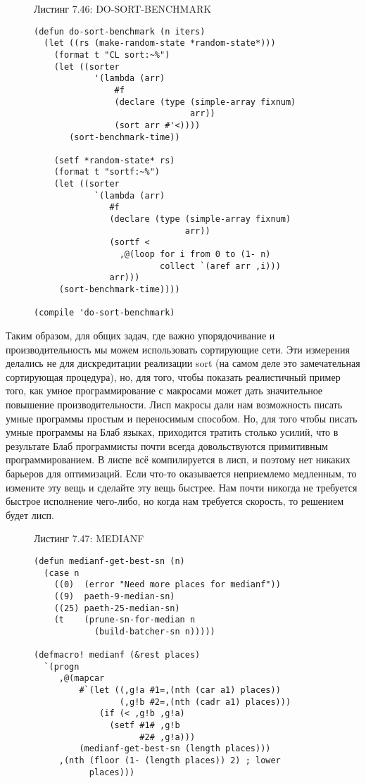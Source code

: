 \begin{figure}Листинг 7.46: DO-SORT-BENCHMARK\label{listing_7.46}
  
\listbegin
\begin{verbatim}
(defun do-sort-benchmark (n iters)
  (let ((rs (make-random-state *random-state*)))
    (format t "CL sort:~%")
    (let ((sorter
            '(lambda (arr)
                #f
                (declare (type (simple-array fixnum)
                               arr))
                (sort arr #'<))))
       (sort-benchmark-time))

    (setf *random-state* rs)
    (format t "sortf:~%")
    (let ((sorter
            `(lambda (arr)
               #f
               (declare (type (simple-array fixnum)
                              arr))
               (sortf <
                 ,@(loop for i from 0 to (1- n)
                         collect `(aref arr ,i)))
               arr)))
     (sort-benchmark-time))))

(compile 'do-sort-benchmark)
\end{verbatim}
\listend
\end{figure}


Таким образом, для общих задач, где важно упорядочивание и производительность мы можем использовать сортирующие сети. Эти измерения делались не для дискредитации реализации sort (на самом деле это замечательная сортирующая процедура), но, для того, чтобы показать реалистичный пример того, как умное программирование с макросами может дать значительное повышение производительности. Лисп макросы дали нам возможность писать умные программы простым и переносимым способом. Но, для того чтобы писать умные программы на Блаб языках, приходится тратить столько усилий, что в результате Блаб программисты почти всегда довольствуются примитивным программированием. В лиспе всё компилируется в лисп, и поэтому нет никаких барьеров для оптимизаций. Если что-то оказывается неприемлемо медленным, то измените эту вещь и сделайте эту вещь быстрее. Нам почти никогда не требуется быстрое исполнение чего-либо, но когда нам требуется скорость, то решением будет лисп.

\begin{figure}Листинг 7.47: MEDIANF\label{listing_7.47}
\listbegin
\begin{verbatim}
(defun medianf-get-best-sn (n)
  (case n
    ((0)  (error "Need more places for medianf"))
    ((9)  paeth-9-median-sn)
    ((25) paeth-25-median-sn)
    (t    (prune-sn-for-median n
            (build-batcher-sn n)))))

(defmacro! medianf (&rest places)
  `(progn
     ,@(mapcar
         #`(let ((,g!a #1=,(nth (car a1) places))
                 (,g!b #2=,(nth (cadr a1) places)))
             (if (< ,g!b ,g!a)
               (setf #1# ,g!b
                     #2# ,g!a)))
         (medianf-get-best-sn (length places)))
     ,(nth (floor (1- (length places)) 2) ; lower
           places)))
\end{verbatim}
\listend
\end{figure}

